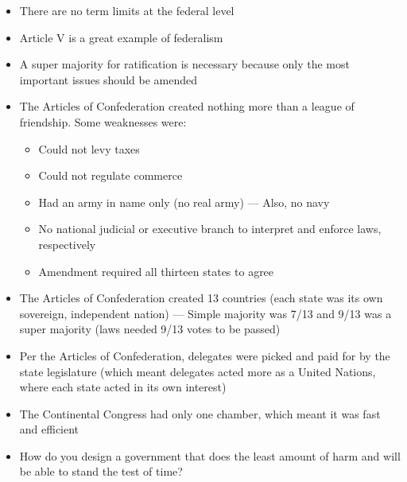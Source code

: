 \documentclass[12pt]{article}
\begin{document}
\begin{itemize}
  \item There are no term limits at the federal level

  \item Article V is a great example of federalism

  \item A super majority for ratification is necessary because only the most important issues should be amended

  \item The Articles of Confederation created nothing more than a league of friendship. Some weaknesses were:

    \begin{itemize}
        
      \item Could not levy taxes

      \item Could not regulate commerce
        
      \item Had an army in name only (no real army) — Also, no navy

      \item No national judicial or executive branch to interpret and enforce laws, respectively

      \item Amendment required all thirteen states to agree

    \end{itemize}

  \item The Articles of Confederation created 13 countries (each state was its own sovereign, independent nation) — Simple majority was 7/13 and 9/13 was a super majority (laws needed 9/13 votes to be passed)

  \item Per the Articles of Confederation, delegates were picked and paid for by the state legislature (which meant delegates acted more as a United Nations, where each state acted in its own interest)

  \item The Continental Congress had only one chamber, which meant it was fast and efficient

  \item How do you design a government that does the least amount of harm and will be able to stand the test of time?


    \begin{itemize}


\end{itemize}
\end{itemize}
\end{document}

